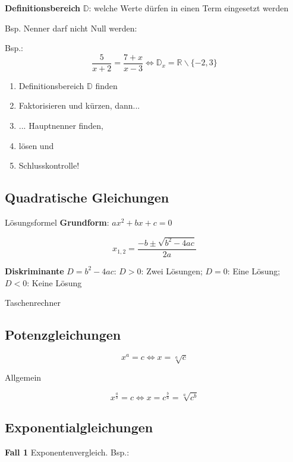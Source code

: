 \begin{multicols}{2}
\begin{definition*}{}{}

\textbf{Definitionsbereich} $\mathbb{D}$: welche Werte dürfen in einen Term eingesetzt werden

Bsp. Nenner darf nicht Null werden:

Bsp.: $$\frac5{x+2}=\frac{7+x}{x-3} \Leftrightarrow{} \mathbb{D}_x=\mathbb{R}\backslash{}\{-2, 3\}$$
\end{definition*}

\begin{rezept*}{}{}
\begin{enumerate}
\item Definitionsbereich $\mathbb{D}$ finden
\item Faktorisieren und kürzen, dann...
\item ... Hauptnenner finden,
\item lösen und 
\item Schlusskontrolle!
\end{enumerate}
\end{rezept*}


\forceCB
\subsection*{Quadratische Gleichungen}
\begin{gesetz*}{Lösungsformel}{}
\textbf{Grundform}: $ax^2 + bx+c = 0$

$$x_{1,2} = \frac{-b \pm \sqrt{b^2-4ac}}{2a}$$
\end{gesetz*}

\textbf{Diskriminante} $D = b^2-4ac$:
$D>0$: Zwei Lösungen;
$D=0$: Eine Lösung;
$D<0$: Keine Lösung


Taschenrechner \\

\hrulefill

\subsection*{Potenzgleichungen}

$$x^a=c \Leftrightarrow x=\sqrt[a]{c}$$

Allgemein

$$x^{\frac{a}b} = c \Leftrightarrow{}
x=c^{\frac{b}a} = \sqrt[a]{c^b}$$

\subsection*{Exponentialgleichungen}
\textbf{Fall 1} Exponentenvergleich. Bsp.:


\end{multicols}
